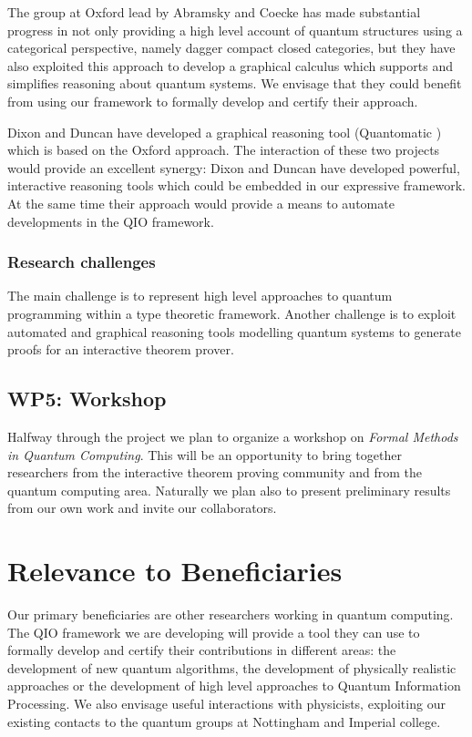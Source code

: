 \documentclass[a4paper]{article}
\begin{document}
The group at Oxford lead by Abramsky and Coecke has made substantial
progress in not only providing a high level account of quantum
structures using a categorical perspective, namely dagger compact
closed categories, but they have also exploited this approach to
develop a graphical calculus which supports and simplifies reasoning
about quantum systems. We envisage that they could benefit from using
our framework to formally develop and certify their approach.

Dixon and Duncan have developed a graphical reasoning tool
(Quantomatic ) which is based on the Oxford approach. 
The interaction
of these two projects would provide an excellent synergy: Dixon and
Duncan have developed powerful, interactive reasoning tools which could
be embedded in our expressive framework. At the same time their
approach would provide a means to automate developments in the QIO
framework. 

\subsubsection*{Research challenges}

The main challenge is to represent high level approaches to quantum
programming within a type theoretic framework. Another challenge is to
exploit automated and graphical reasoning tools modelling quantum
systems to generate proofs for an interactive theorem prover. 

\subsection*{WP5: Workshop}
\label{sec:wp5:-summerschool}

Halfway through the project we plan to organize a workshop on
\emph{Formal Methods in Quantum Computing}. This will be an
opportunity to bring together researchers from the interactive theorem
proving community and from the quantum computing area. Naturally we
plan also to present preliminary results from our own work and invite
our collaborators.

\section{Relevance to Beneficiaries}

Our primary beneficiaries are other researchers working in quantum
computing. The QIO framework we are developing will provide a tool
they can use to formally develop and certify their contributions in
different areas: the development of new quantum algorithms, the
development of physically realistic approaches or the development of
high level approaches to Quantum Information Processing. We also
envisage useful interactions with physicists, exploiting our existing
contacts to the quantum groups at Nottingham and Imperial college.
\end{document}
